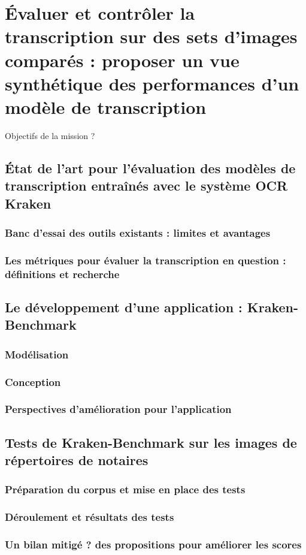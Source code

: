 \part{Évaluer et contrôler la transcription sur des sets d'images comparés : proposer un vue synthétique des performances d'un modèle de transcription}

Objectifs de la mission ? 

\chapter{État de l'art pour l'évaluation des modèles de transcription entraînés avec le système OCR Kraken}
\section{Banc d'essai des outils existants : limites et avantages}
\section{Les métriques pour évaluer la transcription en question : définitions et recherche}

\chapter{Le développement d'une application : Kraken-Benchmark}
\section{Modélisation}
\section{Conception}
\section{Perspectives d'amélioration pour l'application}

\chapter{Tests de Kraken-Benchmark sur les images de répertoires de notaires}
\section{Préparation du corpus et mise en place des tests}
\section{Déroulement et résultats des tests}
\section{Un bilan mitigé ? des propositions pour améliorer les scores}